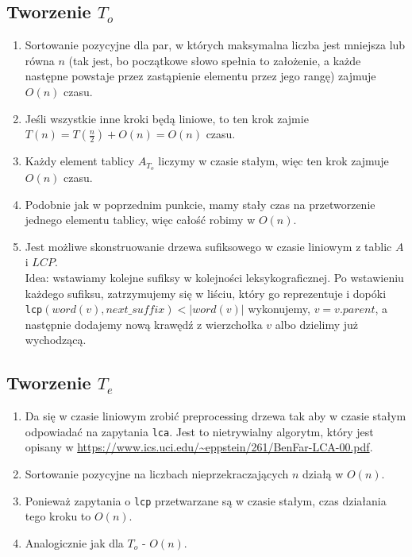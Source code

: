 \documentclass[a4paper,oneside,10pt]{book}
\begin{document}
\subsection*{Tworzenie $T_o$}
\begin{enumerate}
\item Sortowanie pozycyjne dla par, w których maksymalna liczba jest mniejsza lub równa $n$ (tak jest, bo początkowe słowo spełnia to założenie, a każde następne powstaje przez zastąpienie elementu przez jego rangę) zajmuje $O(n)$ czasu.
\item Jeśli wszystkie inne kroki będą liniowe, to ten krok zajmie $T(n) = T(\frac{n}{2}) + O(n) = O(n)$ czasu.
\item Każdy element tablicy $A_{T_o}$ liczymy w czasie stałym, więc ten krok zajmuje $O(n)$ czasu.
\item Podobnie jak w poprzednim punkcie, mamy stały czas na przetworzenie jednego elementu tablicy, więc całość robimy w $O(n)$.
\item Jest możliwe skonstruowanie drzewa sufiksowego w czasie liniowym z tablic $A$ i $LCP$.\\ Idea: wstawiamy kolejne sufiksy w kolejności leksykograficznej. Po wstawieniu każdego sufiksu, zatrzymujemy się w liściu, który go reprezentuje i dopóki \verb|lcp|$(word(v), next\_suffix) < |word(v)|$ wykonujemy, $v = v.parent$, a następnie dodajemy nową krawędź z wierzchołka $v$ albo dzielimy już wychodzącą.
\end{enumerate}
\subsection*{Tworzenie $T_e$}
\begin{enumerate}
\item Da się w czasie liniowym zrobić preprocessing drzewa tak aby w czasie stałym odpowiadać na zapytania \verb|lca|. Jest to nietrywialny algorytm, który jest opisany w \url{https://www.ics.uci.edu/~eppstein/261/BenFar-LCA-00.pdf}.
\item Sortowanie pozycyjne na liczbach nieprzekraczających $n$ działą w $O(n)$.
\item Ponieważ zapytania o \verb|lcp| przetwarzane są w czasie stałym, czas działania tego kroku to $O(n)$.
\item Analogicznie jak dla $T_o$ - $O(n)$.
\end{enumerate}
\end{document}
